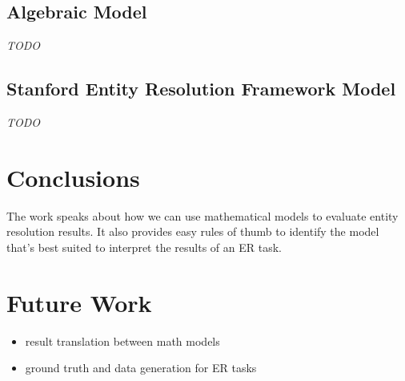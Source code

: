 \documentclass[11pt]{article}
\begin{document}
    \subsection{Algebraic Model}

    \textit{TODO}

    \subsection{Stanford Entity Resolution Framework Model}

    \textit{TODO}

    \section[conclusion]{Conclusions}\label{section:conclusions}

    The work speaks about how we can use mathematical models to evaluate entity resolution results. It also provides easy rules of thumb to identify the model that's best suited to interpret the results of an ER task.
    
    \section[future]{Future Work}\label{section:future}
    \begin{itemize}
        \item result translation between math models
        \item ground truth and data generation for ER tasks
    \end{itemize}


    
\end{document}
